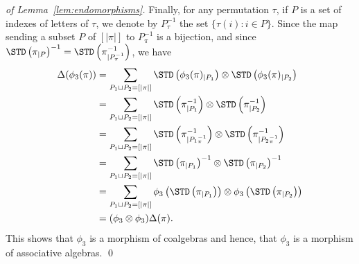 \begin{proof}[of Lemma~\ref{lem:endomorphisms}]
    Finally, for any permutation $\tau$, if $P$ is a set of indexes of
    letters of $\tau$, we denote by $P_\tau^{-1}$ the set
    $\{\tau(i) : i \in P\}$. Since the map sending a subset $P$ of
    $[|\pi|]$ to $P_\pi^{-1}$ is a bijection, and since
    $\STD\left(\pi_{|P}\right)^{-1} = \STD\left(\pi^{-1}_{|P_\pi^{-1}}\right)$,
    we have
    \begin{equation} \begin{split}
        \Delta(\phi_3(\pi))
        & = \sum_{P_1 \sqcup P_2 = [|\pi|]}
        \STD\left(\phi_3(\pi)_{|P_1}\right)
        \otimes \STD\left(\phi_3(\pi)_{|P_2}\right) \\
        & = \sum_{P_1 \sqcup P_2 = [|\pi|]}
        \STD\left(\pi^{-1}_{|P_1}\right)
        \otimes \STD\left(\pi^{-1}_{|P_2}\right) \\
        & = \sum_{P_1 \sqcup P_2 = [|\pi|]}
        \STD\left(\pi^{-1}_{|{P_1}_\pi^{-1}}\right)
        \otimes \STD\left(\pi^{-1}_{|{P_2}_\pi^{-1}}\right) \\
        & = \sum_{P_1 \sqcup P_2 = [|\pi|]}
        \STD\left(\pi_{|P_1}\right)^{-1}
        \otimes \STD\left(\pi_{|P_2}\right)^{-1} \\
        & = \sum_{P_1 \sqcup P_2 = [|\pi|]}
        \phi_3\left(\STD\left(\pi_{|P_1}\right)\right)
        \otimes \phi_3\left(\STD\left(\pi_{|P_2}\right)\right) \\
        & = (\phi_3 \otimes \phi_3) \Delta(\pi).
    \end{split} \end{equation}
    This shows that $\phi_3$ is a morphism of coalgebras and hence, that
    $\phi_3$ is a morphism of associative algebras.
    \qed
\end{proof}
\bigskip

